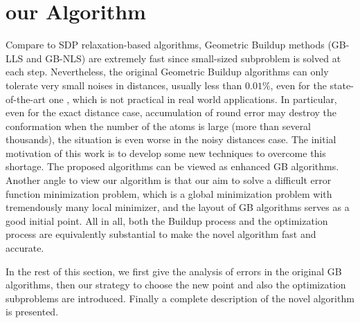 \documentclass[a4paper,12pt]{article}
\begin{document}
\section{our Algorithm}\label{sec:alg}
Compare to SDP relaxation-based algorithms, Geometric Buildup methods (GB-LLS and GB-NLS) are extremely fast since small-sized subproblem is solved at each step. Nevertheless, the original Geometric Buildup algorithms can only tolerate very small noises in distances, usually less than $0.01\%$, even for the state-of-the-art one \cite{Sit2009}, which is not practical in real world applications. In particular, even for the exact distance case, accumulation of round error may destroy the conformation when the number of the atoms is large (more than several thousands), the situation is even worse in the noisy distances case. The initial motivation of this work is to develop some new techniques to overcome this shortage. The proposed algorithms can be viewed as enhanced GB algorithms. Another angle to view our algorithm is that our aim to solve a difficult error function minimization problem, which is a global minimization problem with tremendously many local minimizer, and the layout of GB algorithms serves as a good initial point. All in all, both the Buildup process and the optimization process are equivalently substantial to make the novel algorithm fast and accurate.

In the rest of this section, we first give the analysis of errors in the original GB algorithms, then our strategy to choose the new point and also the optimization subproblems are introduced. Finally a complete description of the novel algorithm is presented.
\end{document}
